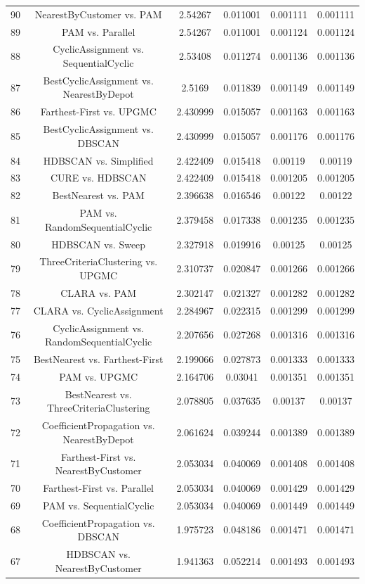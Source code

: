 \documentclass[a4paper,10pt]{article}
\begin{document}
\begin{landscape}
\begin{table}[!htp]
\begin{tabular}{cccccc}
90&NearestByCustomer vs. PAM&2.54267&0.011001&0.001111&0.001111\\
89&PAM vs. Parallel&2.54267&0.011001&0.001124&0.001124\\
88&CyclicAssignment vs. SequentialCyclic&2.53408&0.011274&0.001136&0.001136\\
87&BestCyclicAssignment vs. NearestByDepot&2.5169&0.011839&0.001149&0.001149\\
86&Farthest-First vs. UPGMC&2.430999&0.015057&0.001163&0.001163\\
85&BestCyclicAssignment vs. DBSCAN&2.430999&0.015057&0.001176&0.001176\\
84&HDBSCAN vs. Simplified&2.422409&0.015418&0.00119&0.00119\\
83&CURE vs. HDBSCAN&2.422409&0.015418&0.001205&0.001205\\
82&BestNearest vs. PAM&2.396638&0.016546&0.00122&0.00122\\
81&PAM vs. RandomSequentialCyclic&2.379458&0.017338&0.001235&0.001235\\
80&HDBSCAN vs. Sweep&2.327918&0.019916&0.00125&0.00125\\
79&ThreeCriteriaClustering vs. UPGMC&2.310737&0.020847&0.001266&0.001266\\
78&CLARA vs. PAM&2.302147&0.021327&0.001282&0.001282\\
77&CLARA vs. CyclicAssignment&2.284967&0.022315&0.001299&0.001299\\
76&CyclicAssignment vs. RandomSequentialCyclic&2.207656&0.027268&0.001316&0.001316\\
75&BestNearest vs. Farthest-First&2.199066&0.027873&0.001333&0.001333\\
74&PAM vs. UPGMC&2.164706&0.03041&0.001351&0.001351\\
73&BestNearest vs. ThreeCriteriaClustering&2.078805&0.037635&0.00137&0.00137\\
72&CoefficientPropagation vs. NearestByDepot&2.061624&0.039244&0.001389&0.001389\\
71&Farthest-First vs. NearestByCustomer&2.053034&0.040069&0.001408&0.001408\\
70&Farthest-First vs. Parallel&2.053034&0.040069&0.001429&0.001429\\
69&PAM vs. SequentialCyclic&2.053034&0.040069&0.001449&0.001449\\
68&CoefficientPropagation vs. DBSCAN&1.975723&0.048186&0.001471&0.001471\\
67&HDBSCAN vs. NearestByCustomer&1.941363&0.052214&0.001493&0.001493\\

\end{tabular}
\end{table}
\end{landscape}
\end{document}
